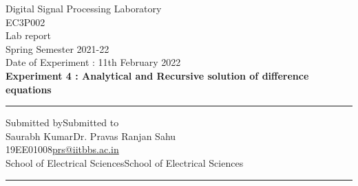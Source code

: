 \documentclass[12pt, letterpaper]{article}
\begin{document}
\begin{center}
	\Huge{Digital Signal Processing Laboratory}\\
	\vspace{2cm}
	\huge{EC3P002}\\
	\vspace{1.5cm}
	\huge{Lab report}\\
	\vspace{1cm}
	\huge{Spring Semester 2021-22}\\
	\vspace{2cm}
	\huge{Date of Experiment : 11th February 2022}\\
	\vspace{2cm}
	\huge{\textbf{Experiment 4 : Analytical and Recursive solution of difference equations}}
	\vspace{4cm}
\end{center}
\rule{\textwidth}{0.5pt}
	\large{Submitted by}\hspace{4.3in}\large{Submitted to}\\
	\large{Saurabh Kumar}\hspace{3.3in}\large{Dr. Pravas Ranjan Sahu}\\
	\large{19EE01008}\hspace{4.3in}\href{mailto:prs@iitbbs.ac.in}{\large{prs@iitbbs.ac.in}}\\
	\large{School of Electrical Sciences}\hspace{2.20in}\large{School of Electrical Sciences}\\
\rule{\textwidth}{0.5pt}
\\
\tableofcontents
\newpage
\end{document}
